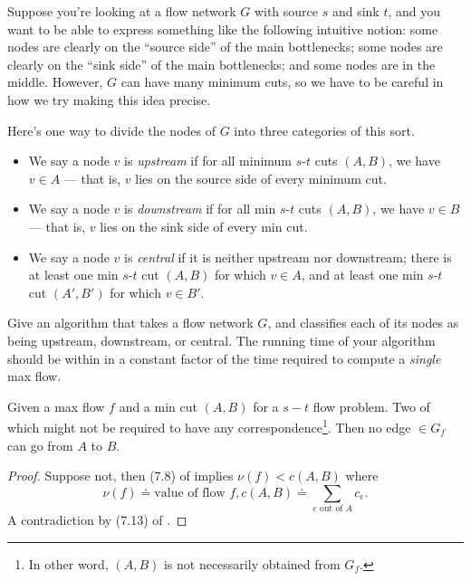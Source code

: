 \documentclass[11pt]{article}
\theoremstyle{numberplain}
\theoremstyle{nonumberplain}
\newtheorem{proof}{Proof}
\newcommand{\0}{{\mathbf{0}}}
\begin{document}
\begin{ques}[HW6, 7-23] Suppose you're looking at a flow network $G$
with source $s$ and sink $t$, and
you want to be able to express something like the following
intuitive notion: some nodes are clearly on the ``source side''
of the main bottlenecks; some nodes are clearly on the ``sink side''
of the main bottlenecks; and some nodes are in the middle.
However, $G$ can have many minimum cuts, so we have
to be careful in how we try making this idea precise.

Here's one way to divide the nodes of $G$ into three
categories of this sort.
\begin{itemize}
\item We say a node $v$ is {\em upstream} if for all minimum $s$-$t$ cuts $(A,B)$, we have $v \in A$ --- that is, $v$ lies on the source side of every minimum cut. \item We say a node $v$ is {\em downstream} if for all min $s$-$t$ cuts $(A,B)$, we have $v \in B$ --- that is, $v$ lies on the sink side of every min cut. 

\item We say a node $v$ is {\em central} if it is neither upstream nor downstream; there is at least one min $s$-$t$ cut $(A,B)$ for which $v \in A$, and at least one min $s$-$t$ cut $(A',B')$ for which $v \in B'$.
\end{itemize}

Give an algorithm that takes a flow network $G$, and
classifies each of its nodes as being upstream, downstream, or central.
The running time of your algorithm should be within in a constant
factor of the time required to compute a {\em single} max flow.
 
\end{ques}
\begin{lem} Given a max flow $f$ and a min cut $(A,B)$ for a $s-t$ flow problem. Two of which might not be required to have any correspondence\footnote{In other word, $(A,B)$ is not necessarily obtained from $G_f$.}. Then no edge $\in G_{f}$ can go from $A$ to $B$.
\end{lem}
\begin{proof}
Suppose not, then (7.8) of \cite{jon2005algorithm} implies $\nu(f)<c(A,B)$ where
$$\nu(f)\doteq \text{value of flow }f, c(A,B)\doteq \sum_{e\text{ out of }A}c_e.$$
A contradiction by (7.13) of \cite{jon2005algorithm}.
\end{proof}
\end{document}
